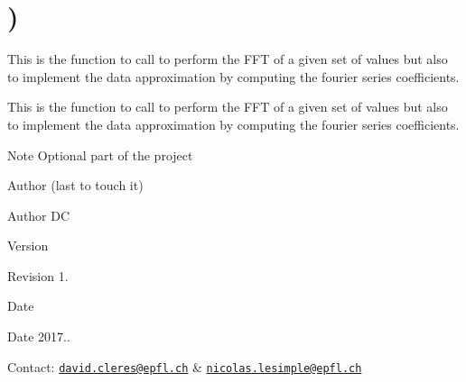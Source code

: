 \hypertarget{group__somewhere}{}\section{)}
\label{group__somewhere}


This is the function to call to perform the F\+FT of a given set of values but also to implement the data approximation by computing the fourier series coefficients.  


This is the function to call to perform the F\+FT of a given set of values but also to implement the data approximation by computing the fourier series coefficients. 

\begin{DoxyNote}{Note}
Optional part of the project
\end{DoxyNote}
\begin{DoxyAuthor}{Author}
(last to touch it) 
\end{DoxyAuthor}
\begin{DoxyParagraph}{Author}
DC 
\end{DoxyParagraph}


\begin{DoxyVersion}{Version}

\end{DoxyVersion}
\begin{DoxyParagraph}{Revision}
1. 
\end{DoxyParagraph}


\begin{DoxyDate}{Date}

\end{DoxyDate}
\begin{DoxyParagraph}{Date}
2017.. 
\end{DoxyParagraph}


Contact\+: \href{mailto:david.cleres@epfl.ch}{\tt david.\+cleres@epfl.\+ch} \& \href{mailto:nicolas.lesimple@epfl.ch}{\tt nicolas.\+lesimple@epfl.\+ch} 